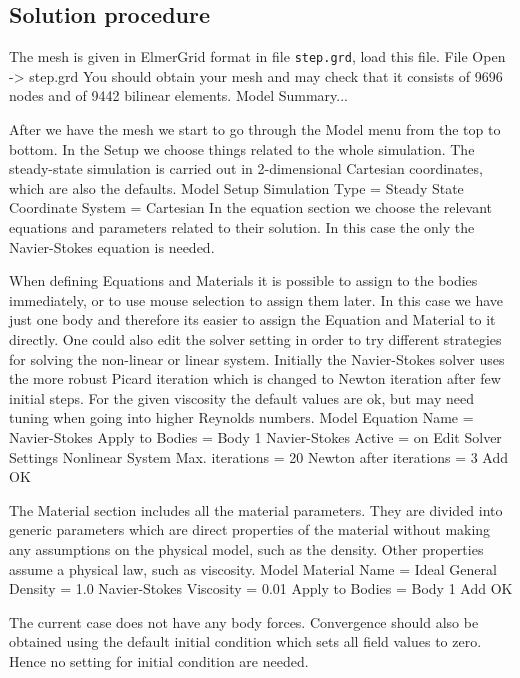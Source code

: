 \subsection*{Solution procedure}

The mesh is given in ElmerGrid format in file \texttt{step.grd}, load this file.
\ttbegin
File 
  Open -> step.grd
\ttend
You should obtain your mesh and may check that it consists of 9696 nodes and of 
9442 bilinear elements.
\ttbegin
Model 
  Summary...
\ttend

After we have the mesh we start to go through the Model menu from the top to bottom. 
In the Setup we choose things related to the whole simulation.
The steady-state simulation is carried out in 2-dimensional Cartesian
coordinates, which are also the defaults.  
\ttbegin
Model
  Setup 
    Simulation Type = Steady State
    Coordinate System = Cartesian
\ttend
In the equation section we choose the relevant equations and parameters related to their solution. 
In this case the only the Navier-Stokes equation is needed.

When defining Equations and Materials it is possible to assign to the bodies immediately, or to use mouse
selection to assign them later. In this case we have just one body and therefore its easier to assign 
the Equation and Material to it directly. One could also edit the solver setting in order to
try different strategies for solving the non-linear or linear system. Initially the Navier-Stokes
solver uses the more robust Picard iteration which is changed to Newton iteration after few initial steps.
For the given viscosity the default values are ok, but may need tuning when going into higher Reynolds numbers.
\ttbegin
Model
  Equation
    Name = Navier-Stokes
    Apply to Bodies = Body 1
    Navier-Stokes 
      Active = on
      Edit Solver Settings
        Nonlinear System
          Max. iterations = 20
          Newton after iterations = 3
    Add 
    OK
\ttend        

The Material section includes all the material parameters.
They are divided into generic parameters which are direct properties of the material
without making any assumptions on the physical model, such as the density. Other properties assume
a physical law, such as viscosity. 
\ttbegin
Model
  Material
    Name = Ideal
    General 
      Density = 1.0
    Navier-Stokes 
      Viscosity = 0.01
    Apply to Bodies = Body 1 
    Add
    OK
\ttend

The current case does not have any body forces. Convergence should also be
obtained using the default initial condition which sets all field values to zero. 
Hence no setting for initial condition are needed. 

